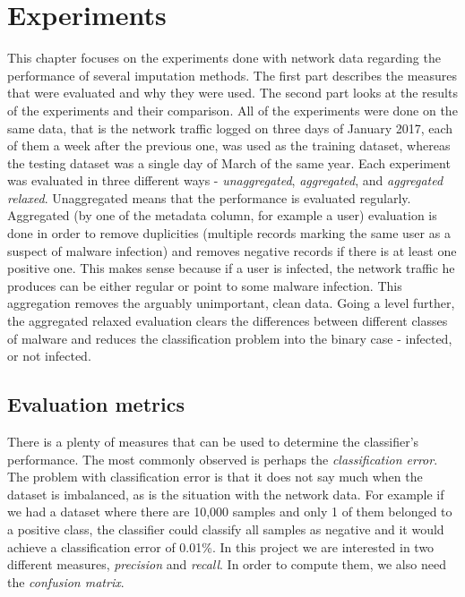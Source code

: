 \documentclass[11pt]{article}
\begin{document}
  \section{Experiments}
    \label{sec:experiments}
    This chapter focuses on the experiments done with network data regarding the performance of several imputation methods. The first part describes the measures that were evaluated and why they were used. The second part looks at the results of the experiments and their comparison. All of the experiments were done on the same data, that is the network traffic logged on three days of January 2017, each of them a week after the previous one, was used as the training dataset, whereas the testing dataset was a single day of March of the same year. Each experiment was evaluated in three different ways - {\it unaggregated}, {\it aggregated}, and {\it aggregated relaxed}. Unaggregated means that the performance is evaluated regularly. Aggregated (by one of the metadata column, for example a user) evaluation is done in order to remove duplicities (multiple records marking the same user as a suspect of malware infection) and removes negative records if there is at least one positive one. This makes sense because if a user is infected, the network traffic he produces can be either regular or point to some malware infection. This aggregation removes the arguably unimportant, clean data. Going a level further, the aggregated relaxed evaluation clears the differences between different classes of malware and reduces the classification problem into the binary case - infected, or not infected.
    \subsection{Evaluation metrics}
      There is a plenty of measures that can be used to determine the classifier's performance. The most commonly observed is perhaps the {\it classification error}\cite{brabec}. The problem with classification error is that it does not say much when the dataset is imbalanced, as is the situation with the network data. For example if we had a dataset where there are 10,000 samples and only 1 of them belonged to a positive class, the classifier could classify all samples as negative and it would achieve a classification error of 0.01\%. In this project we are interested in two different measures, {\it precision} and {\it recall}. In order to compute them, we also need the {\it confusion matrix}.
\end{document}
